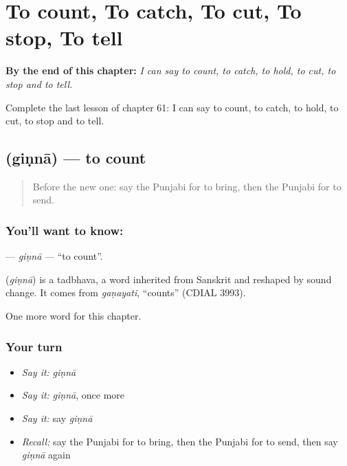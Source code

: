 
\chapter{To count, To catch, To cut, To stop, To tell}
\label{ch:pa-to-count-to-catch-to-cut-to-stop-to-tell}

\begin{chapteropening}
\textbf{By the end of this chapter:} \emph{I can say to count, to catch, to hold, to cut, to stop and to tell.}

Complete the last lesson of chapter 61: I can say to count, to catch, to hold, to cut, to stop and to tell.
\end{chapteropening}

\section[\texorpdfstring{\pa{ਗਿਣਨਾ} (giṇnā)}{ਗਿਣਨਾ (giṇnā)}]{ (giṇnā) — to count}

\label{lesson:PA-C61-ginna}



\begin{quote}
Before the new one: say the Punjabi for to bring, then the Punjabi for to send.
\end{quote}

\subsection*{You'll want to know: }
\textbf{} — \emph{giṇnā} — \textquotedblleft{}to count\textquotedblright{}.

\begin{cousinweb}
\textbf{} (\emph{giṇnā}) is a tadbhava, a word inherited from Sanskrit and reshaped by sound change. It comes from \emph{gaṇayati}, \textquotedblleft{}counts\textquotedblright{} (CDIAL 3993).
\end{cousinweb}

\begin{grammarlens}[title={What you've built}]
One more word for this chapter.
\end{grammarlens}

\subsection*{Your turn}
\begin{itemize}
\raggedright
  \item \emph{Say it:} \emph{giṇnā}
  \item \emph{Say it:} \emph{giṇnā}, once more
  \item \emph{Say it:} say \emph{giṇnā}
  \item \emph{Recall:} say the Punjabi for to bring, then the Punjabi for to send, then say \emph{giṇnā} again
\end{itemize}

